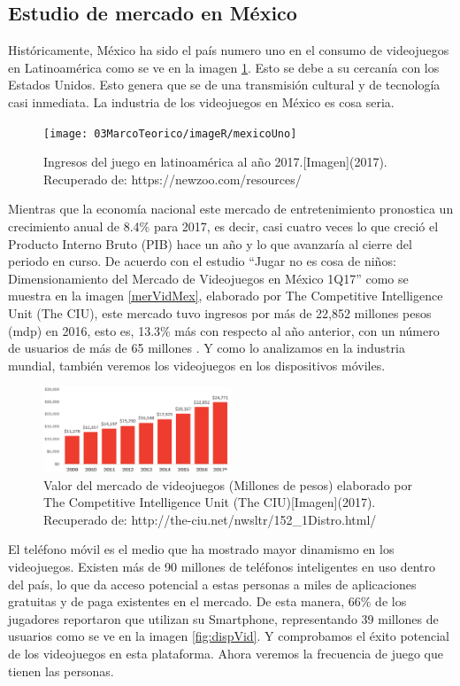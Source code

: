 			 
\subsection{Estudio de mercado en México}

Históricamente, México ha sido el país numero uno en el consumo de videojuegos en Latinoamérica como se ve en la imagen \ref{fig:mexicoUno}. Esto se debe a su cercanía con los Estados Unidos. Esto genera que se de una transmisión cultural y de tecnología casi inmediata. La industria de los videojuegos en México es cosa seria. 
\\[1pt] 
	\begin{figure}
	\centering
	\texttt{[image: 03MarcoTeorico/imageR/mexicoUno]}
	\caption{Ingresos del juego en latinoamérica al año 2017.[Imagen](2017). Recuperado de: https://newzoo.com/resources/}
	\label{fig:mexicoUno}
	\end{figure}

Mientras que la economía nacional este mercado de entretenimiento pronostica un crecimiento anual de 8.4\% para 2017, es decir, casi cuatro veces lo que creció el Producto Interno Bruto (PIB) hace un año y lo que avanzaría al cierre del periodo en curso. De acuerdo con el estudio “Jugar no es cosa de niños: Dimensionamiento del Mercado de Videojuegos en México 1Q17” como se muestra en la imagen \ref{merVidMex}, elaborado por The Competitive Intelligence Unit (The CIU), este mercado tuvo ingresos por más de 22,852 millones pesos (mdp) en 2016, esto es, 13.3\% más con respecto al año anterior, con un número de usuarios de más de 65 millones \cite{vid03}. Y como lo analizamos en la industria mundial, también veremos los videojuegos en los dispositivos móviles.
\\[1pt] 
\begin{figure}
	\centering
	\includegraphics[width=0.5\textwidth]{03MarcoTeorico/imageR/merVidMex}
	\caption{Valor del mercado de videojuegos (Millones de pesos) elaborado por The Competitive Intelligence Unit (The CIU)[Imagen](2017). Recuperado de: http://the-ciu.net/nwsltr/152\_1Distro.html/}
	\label{fig:merVidMex}
\end{figure}

El teléfono móvil es el medio que ha mostrado mayor dinamismo en los videojuegos. Existen más de 90 millones de teléfonos inteligentes en uso dentro del país, lo que da acceso potencial a estas personas a miles de aplicaciones gratuitas y de paga existentes en el mercado. De esta manera, 66\% de los jugadores reportaron que utilizan su Smartphone, representando 39 millones de usuarios como se ve en la imagen \ref{fig:dispVid}. Y comprobamos el éxito potencial de los videojuegos en esta plataforma. Ahora veremos la frecuencia de juego que tienen las personas. 
\\[1pt] 	

